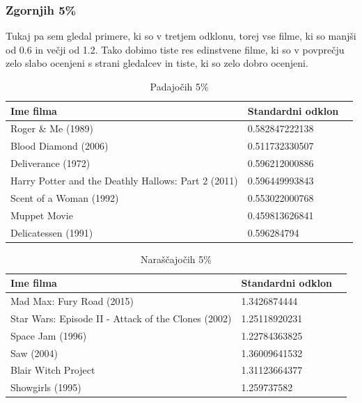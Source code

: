 \documentclass[a4paper,11pt]{article}
\begin{document}
\subsubsection{Zgornjih 5\% }
Tukaj pa sem gledal primere, ki so v tretjem odklonu, torej vse filme, ki so manjši od 0.6 in večji od 1.2. Tako dobimo tiste res edinstvene filme, ki so v povprečju zelo slabo ocenjeni s strani gledalcev in tiste, ki so zelo dobro ocenjeni.
\begin{table}[htbp]
	\caption{Padajočih 5\%}
	\label{tab_pad}
	\begin{center}
		\begin{tabular}{llp{3cm}}
			
			\hline
			Ime filma & Standardni odklon \\
			\hline
			Roger \& Me (1989) & 0.582847222138 \\
			Blood Diamond (2006) & 0.511732330507\\  
			Deliverance (1972) & 0.596212000886\\
			Harry Potter and the Deathly Hallows: Part 2 (2011) & 0.596449993843\\
			Scent of a Woman (1992) & 0.553022000768\\
			Muppet Movie & 0.459813626841 \\
			Delicatessen (1991) & 0.596284794\\
			\hline
		\end{tabular}
	\end{center}
\end{table}

\begin{table}[htbp]
	\caption{Naraščajočih 5\%}
	\label{tab_pad}
	\begin{center}
		\begin{tabular}{llp{3cm}}
			
			\hline
			Ime filma & Standardni odklon \\
			\hline
			Mad Max: Fury Road (2015) & 1.3426874444 \\
			Star Wars: Episode II - Attack of the Clones (2002) & 1.25118920231\\
			Space Jam (1996) & 1.22784363825 \\
			Saw (2004) & 1.36009641532 \\
			Blair Witch Project & 1.31123664377 \\
			Showgirls (1995) & 1.259737582 \\
			\hline
		\end{tabular}
	\end{center}
\end{table}
\end{document}
